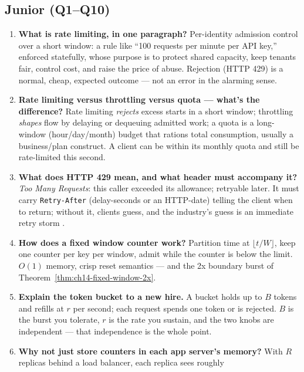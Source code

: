 \subsection*{Junior (Q1--Q10)}
\begin{enumerate}[label=\textbf{Q\arabic*.}, leftmargin=1.6cm]
  \item \textbf{What is rate limiting, in one paragraph?}
        Per-identity admission control over a short window: a rule like
        ``100 requests per minute per API key,'' enforced statefully, whose
        purpose is to protect shared capacity, keep tenants fair, control
        cost, and raise the price of abuse. Rejection (HTTP 429) is a
        normal, cheap, expected outcome --- not an error in the alarming
        sense.
  \item \textbf{Rate limiting versus throttling versus quota --- what's the
        difference?}
        Rate limiting \emph{rejects} excess starts in a short window;
        throttling \emph{shapes} flow by delaying or dequeuing admitted
        work; a quota is a long-window (hour/day/month) budget that rations
        total consumption, usually a business/plan construct. A client can
        be within its monthly quota and still be rate-limited this second.
  \item \textbf{What does HTTP 429 mean, and what header must accompany it?}
        \emph{Too Many Requests}: this caller exceeded its allowance;
        retryable later. It must carry \texttt{Retry-After} (delay-seconds
        or an HTTP-date) telling the client when to return; without it,
        clients guess, and the industry's guess is an immediate retry storm
        \cite{rfc9110}.
  \item \textbf{How does a fixed window counter work?}
        Partition time at $\lfloor t/W \rfloor$, keep one counter per key
        per window, admit while the counter is below the limit. $O(1)$
        memory, crisp reset semantics --- and the 2x boundary burst of
        Theorem~\ref{thm:ch14-fixed-window-2x}.
  \item \textbf{Explain the token bucket to a new hire.}
        A bucket holds up to $B$ tokens and refills at $r$ per second; each
        request spends one token or is rejected. $B$ is the burst you
        tolerate, $r$ is the rate you sustain, and the two knobs are
        independent --- that independence is the whole point.
  \item \textbf{Why not just store counters in each app server's memory?}
        With $R$ replicas behind a load balancer, each replica sees roughly

\end{enumerate}

